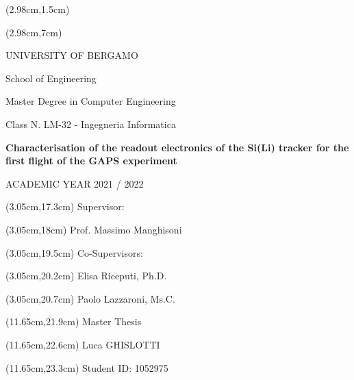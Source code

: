 \thispagestyle{empty}
\begin{textblock*}{\textwidth}(2.98cm,1.5cm)
    \begin{center}
        \vskip0.5cm
          
    \end{center}
\end{textblock*}

\begin{textblock*}{\textwidth}(2.98cm,7cm)
    \begin{center}
        \large
        UNIVERSITY OF BERGAMO
    \end{center}
    \begin{center}
        School of Engineering
    \end{center}
    \vspace{-0.65cm}
    \begin{center}
        Master Degree in Computer Engineering
    \end{center}
    \vspace{-0.65cm}
    \begin{center}
        Class N. LM-32 - Ingegneria Informatica
    \end{center}
    \vspace{1cm}
    \begin{center}
        \LARGE
        \textbf{Characterisation of the readout electronics of the Si(Li) tracker for the first flight of the GAPS experiment}
    \end{center}
    \vspace{10.5cm}
    \begin{center}
         ACADEMIC YEAR 2021 / 2022
    \end{center}
\end{textblock*}

\begin{textblock*}{\textwidth}(3.05cm,17.3cm) 
    Supervisor:
\end{textblock*}
\begin{textblock*}{\textwidth}(3.05cm,18cm)
    Prof. Massimo Manghisoni
\end{textblock*}

\begin{textblock*}{\textwidth}(3.05cm,19.5cm)
    Co-Supervisors:
\end{textblock*}
\begin{textblock*}{\textwidth}(3.05cm,20.2cm)
    Elisa Riceputi, Ph.D.
\end{textblock*}
\begin{textblock*}{\textwidth}(3.05cm,20.7cm) 
    Paolo Lazzaroni, Ms.C.
\end{textblock*}

\begin{textblock*}{\textwidth}(11.65cm,21.9cm)
    Master Thesis
\end{textblock*}
\begin{textblock*}{\textwidth}(11.65cm,22.6cm)
    Luca GHISLOTTI
\end{textblock*}
\begin{textblock*}{\textwidth}(11.65cm,23.3cm) 
    Student ID: 1052975
\end{textblock*}